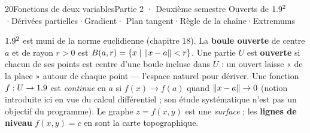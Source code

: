
\begin{ouverture}[niveaux]{20}{Fonctions de deux variables}{Partie 2 · Deuxième semestre}
  {Ouverts de $1.9^{2}$\enspace·\enspace Dérivées partielles\enspace·\enspace Gradient\enspace·\enspace
   Plan tangent\enspace·\enspace Règle de la chaîne\enspace·\enspace Extremums}
\end{ouverture}

\essentiel


\begin{definition}
$1.9^{2}$ est muni de la norme euclidienne (chapitre 18). La \textbf{boule
ouverte} de centre $a$ et de rayon $r>0$ est
$B(a,r)=\left\{x\mid\left\lVert x-a\right\rVert<r\right\}$. Une partie $U$ est \textbf{ouverte} si
chacun de ses points est centre d'une boule incluse dans $U$ : un ouvert
laisse « de la place » autour de chaque point — l'espace naturel pour
dériver. Une fonction $f:U\to1.9$ est \emph{continue} en $a$ si
$f(x)\to f(a)$ quand $\left\lVert x-a\right\rVert\to0$ (notion introduite ici en vue du
calcul différentiel ; son étude systématique n'est pas un objectif du
programme). Le graphe $z=f(x,y)$ est une \emph{surface} ; les
\textbf{lignes de niveau} $f(x,y)=c$ en sont la carte topographique.
\end{definition}

